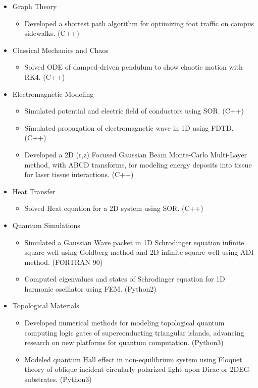 \documentclass[10pt, letterpaper]{article}
\newenvironment{highlights}{
    \begin{itemize}[
        topsep=0.10 cm,
        parsep=0.10 cm,
        partopsep=0pt,
        itemsep=0pt,
        leftmargin=0 cm + 10pt
    ]
}{
    \end{itemize}
} %
\begin{document}
        \begin{onecolumnentry}
          \begin{highlights}
          \item Graph Theory
            \begin{highlights}
              \item Developed a shortest path algorithm for optimizing foot traffic on campus sidewalks. (C++)
            \end{highlights}
          \item Classical Mechanics and Chaos
            \begin{highlights}
              \item Solved ODE of damped-driven pendulum to show chaotic motion with RK4. (C++)
            \end{highlights}
          \item Electromagnetic Modeling
            \begin{highlights}
            \item Simulated potential and electric field of conductors using SOR. (C++)
              \item Simulated propagation of electromagnetic wave in 1D using FDTD. (C++)
              \item Developed a 2D (r,z) Focused Gaussian Beam Monte-Carlo Multi-Layer method, with ABCD transforms, for modeling energy deposits into tissue for laser tissue interactions. (C++)
            \end{highlights}
          \item Heat Transfer
            \begin{highlights}
              \item Solved Heat equation for a 2D system using SOR. (C++)
            \end{highlights}
          \item Quantum Simulations
            \begin{highlights}
              \item Simulated a Gaussian Wave packet in 1D Schrodinger equation infinite square well using Goldberg method and 2D infinite square well using ADI method. (FORTRAN 90)
              \item Computed eigenvalues and states of Schrodinger equation for 1D harmonic oscillator using FEM. (Python2)
            \end{highlights}
          \item Topological Materials
            \begin{highlights}
              \item Developed numerical methods for modeling topological quantum computing logic gates of superconducting triangular islands, advancing research on new platforms for quantum computation. (Python3)
              \item Modeled quantum Hall effect in non-equilibrium system using Floquet theory of oblique incident circularly polarized light upon Dirac or 2DEG substrates. (Python3)
            \end{highlights}
          \end{highlights}
        \end{onecolumnentry}
\end{document}

